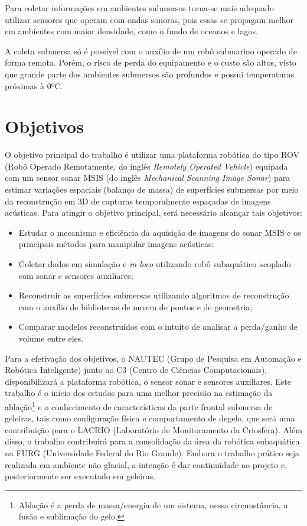 Para coletar informações em ambientes submersos torna-se mais adequado utilizar sensores que operam com ondas sonoras, pois essas se propagam melhor em ambientes com maior densidade, como o fundo de oceanos e lagos.

A coleta submersa só é possível com o auxílio de um robô submarino operado de forma remota.
Porém, o risco de perda do equipamento e o custo são altos, visto que grande parte dos ambientes submersos são profundos e possui temperaturas próximas à 0ºC.

\section{Objetivos}
\label{sec:objetivos}

O objetivo principal do trabalho é utilizar uma plataforma robótica do tipo ROV (Robô Operado Remotamente, do inglês \textit{Remotely Operated Vehicle}) equipada com um sensor sonar MSIS (do inglês \textit{Mechanical Scanning Image Sonar}) para estimar variações espaciais (balanço de massa) de superfícies submersas por meio da reconstrução em 3D de capturas temporalmente espaçadas de imagens acústicas. 
Para atingir o objetivo principal, será necessário alcançar tais objetivos:

\begin{itemize}
    \item Estudar o mecanismo e eficiência da aquisição de imagens do sonar MSIS e os principais métodos para manipular imagens acústicas;
    \item Coletar dados em simulação e \textit{in loco} utilizando robô subaquático acoplado com sonar e sensores auxiliares;
    \item Reconstruir as superfícies submersas utilizando algoritmos de reconstrução com o auxílio de bibliotecas de nuvem de pontos e de geometria;
    \item Comparar modelos reconstruídos com o intuito de analisar a perda/ganho de volume entre eles. 
\end{itemize}
\hspace{1em}

Para a efetivação dos objetivos, o NAUTEC (Grupo de Pesquisa em Automação e Robótica Inteligente) junto ao C3 (Centro de Ciências Computacionais), disponibilizará a plataforma robótica, o sensor sonar e sensores auxiliares. Este trabalho é o inicio dos estudos para uma melhor precisão na estimação da ablação\footnote{Ablação é a perda de massa/energia de um sistema, nessa circunstância, a fusão e sublimação do gelo.} e o conhecimento de características da parte frontal submersa de geleiras, tais como configuração física e comportamento de degelo, que será uma contribuição para o LACRIO (Laboratório de Monitoramento da Criosfera). Além disso, o trabalho contribuirá para a consolidação da área da robótica subaquática na FURG (Universidade Federal do Rio Grande).
Embora o trabalho prático seja realizada em ambiente não glacial, a intenção é dar continuidade ao projeto e, posteriormente ser executado em geleiras.


